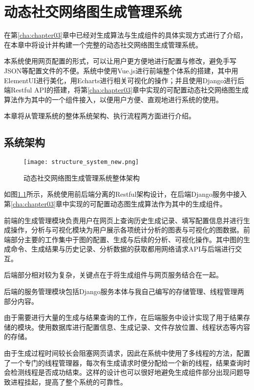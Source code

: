 
\chapter{动态社交网络图生成管理系统}
\label{cha:chapter04}

在第\ref{cha:chapter03}章中已经对生成算法与生成组件的具体实现方式进行了介绍，在本章中将设计并构建一个完整的动态社交网络图生成管理系统。

本系统使用网页配置的形式，可以让用户更方便地进行配置与修改，避免手写JSON等配置文件的不便。系统中使用Vue.js进行前端整个体系的搭建，其中用ElementUI进行美化，用Echarts进行相关可视化的操作；并且使用Django进行后端Restful API的搭建，将第\ref{cha:chapter03}章中实现的可配置动态社交网络图生成算法作为其中的一个组件接入，以便用户方便、直观地进行系统的使用。

本章将从管理系统的整体系统架构、执行流程两方面进行介绍。

\section{系统架构}

\begin{figure}[H]
  \centering
  \texttt{[image: structure\_system\_new.png]}
  \caption{动态社交网络图生成管理系统整体架构}
  \label{fig:web_system}
\end{figure}

如图\ref{fig:web_system}所示，系统使用前后端分离的Restful架构设计，在后端Django服务中接入第\ref{cha:chapter03}章中实现的可配置动态图生成算法作为其中的生成组件。

前端的生成管理模块负责用户在网页上查询历史生成记录、填写配置信息并进行生成操作，分析与可视化模块为用户展示各项统计分析的图表与可视化的图数据。前端部分主要的工作集中于图的配置、生成与后续的分析、可视化操作。其中图的生成命令、生成结果与历史记录、分析数据的获取都用网络请求API与后端进行交互。

后端部分相对较为复杂，关键点在于将生成组件与网页服务结合在一起。

后端的服务管理模块包括Django服务本体与我自己编写的存储管理、线程管理两部分内容。

由于需要进行大量的生成与结果查询的工作，在后端服务中设计实现了用于结果存储的模块。使用数据库进行配置信息、生成记录、文件存放位置、线程状态等内容的存储。

由于生成过程时间较长会阻塞网页请求，因此在系统中使用了多线程的方法，配置了一个专门的线程管理器，每次有生成请求时便分配给一个新的线程，结果查询时会检测线程是否成功结束。这样的设计也可以很好地避免生成组件部分出现问题导致进程挂起，提高了整个系统的可靠性。

